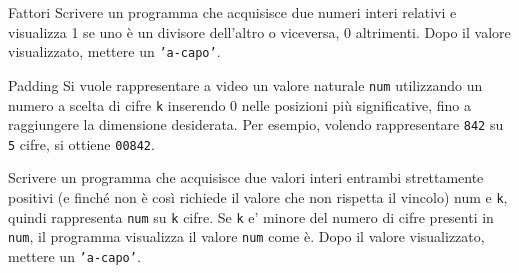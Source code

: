 \begin{labex}{Fattori}
Scrivere un programma che acquisisce due numeri interi relativi e visualizza 1 se uno \`e un divisore dell'altro o viceversa, 0 altrimenti.
Dopo il valore visualizzato, mettere un \texttt{'a-capo'}.

\begin{labexinout}
\end{labexinout}

\begin{labexcases}


\end{labexcases}


\end{labex}


\begin{labex}{Padding}
Si vuole rappresentare a video un valore naturale \texttt{num} utilizzando un numero a scelta di cifre \texttt{k} inserendo 0 nelle posizioni pi\`u significative, fino a raggiungere la dimensione desiderata. 
Per esempio, volendo rappresentare \texttt{842} su \texttt{5} cifre, si ottiene \texttt{00842}.

Scrivere un programma che acquisisce due valori interi entrambi strettamente positivi (e finch\'e non \`e cos\`i richiede il valore che non rispetta il vincolo) num e \texttt{k}, quindi rappresenta \texttt{num} su \texttt{k} cifre. Se \texttt{k} e' minore del numero di cifre presenti in \texttt{num}, il programma visualizza il valore \texttt{num} come \`e. 
Dopo il valore visualizzato, mettere un \texttt{'a-capo'}.


\begin{labexinout}
\end{labexinout}

\begin{labexcases}


\end{labexcases}



\end{labex}

